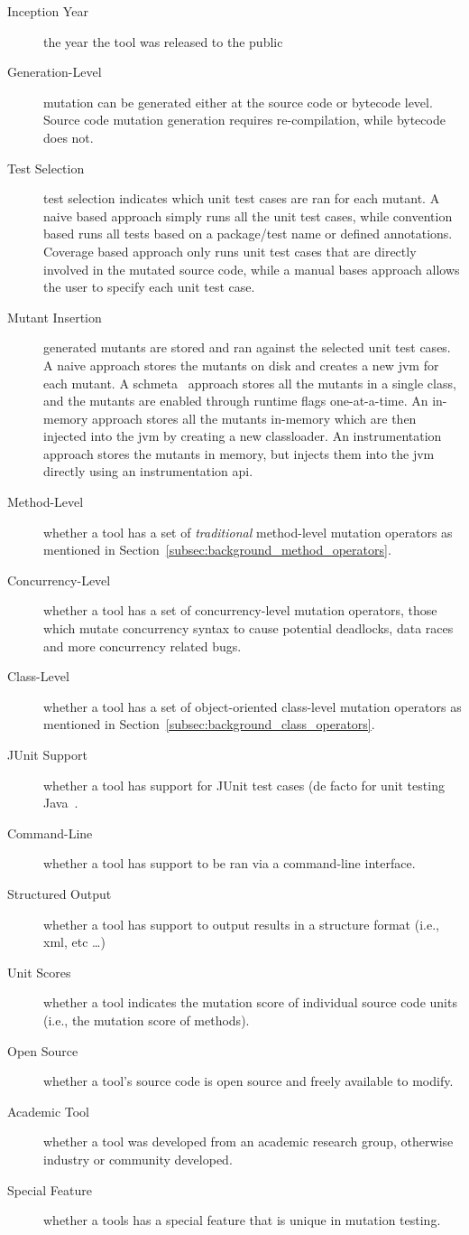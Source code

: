 \begin{description}
  \item [Inception Year] the year the tool was released to the public
  \item [Generation-Level] mutation can be generated either at the source code or bytecode level. Source code mutation generation requires re-compilation, while bytecode does not.
  \item [Test Selection] test selection indicates which unit test cases are ran for each mutant. A naive based approach simply runs all the unit test cases, while convention based runs all tests based on a package/test name or defined annotations. Coverage based approach only runs unit test cases that are directly involved in the mutated source code, while a manual bases approach allows the user to specify each unit test case.
  \item [Mutant Insertion] generated mutants are stored and ran against the selected unit test cases. A naive approach stores the mutants on disk and creates a new \gls{jvm} for each mutant. A schmeta~\cite{UOH93} approach stores all the mutants in a single class, and the mutants are enabled through runtime flags one-at-a-time. An in-memory approach stores all the mutants in-memory which are then injected into the \gls{jvm} by creating a new classloader. An instrumentation approach stores the mutants in memory, but injects them into the \gls{jvm} directly using an instrumentation \gls{api}.
  \item [Method-Level] whether a tool has a set of \emph{traditional} method-level mutation operators as mentioned in Section~\ref{subsec:background_method_operators}.
  \item [Concurrency-Level] whether a tool has a set of concurrency-level mutation operators, those which mutate concurrency syntax to cause potential deadlocks, data races and more concurrency related bugs.
  \item [Class-Level] whether a tool has a set of object-oriented class-level mutation operators as mentioned in Section~\ref{subsec:background_class_operators}.
  \item [JUnit Support] whether a tool has support for JUnit test cases (de facto for unit testing Java~\cite{JUnit}.
  \item [Command-Line] whether a tool has support to be ran via a command-line interface.
  \item [Structured Output] whether a tool has support to output results in a structure format (i.e., \gls{xml}, etc \ldots)
  \item [Unit Scores] whether a tool indicates the mutation score of individual source code units (i.e., the mutation score of methods).
  \item [Open Source] whether a tool's source code is open source and freely available to modify.
  \item [Academic Tool] whether a tool was developed from an academic research group, otherwise industry or community developed.
  \item [Special Feature] whether a tools has a special feature that is unique in mutation testing.
\end{description}

